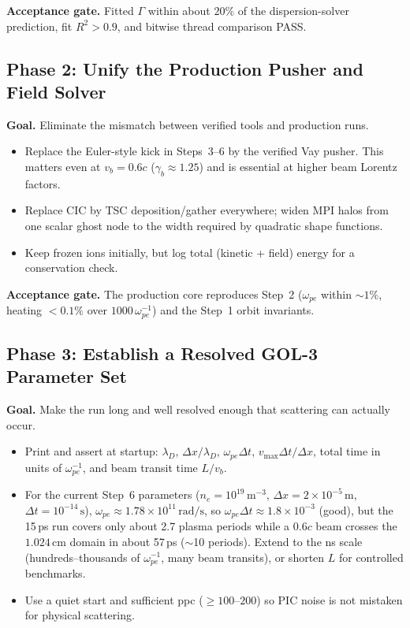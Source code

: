 \documentclass[11pt,a4paper]{article}
\begin{document}
\textbf{Acceptance gate.} Fitted $\Gamma$ within about $20\%$ of the dispersion-solver prediction,
fit $R^2>0.9$, and bitwise thread comparison PASS.

\subsection{Phase 2: Unify the Production Pusher and Field Solver}

\textbf{Goal.} Eliminate the mismatch between verified tools and production runs.

\begin{itemize}[leftmargin=*]
  \item Replace the Euler-style kick in Steps~3--6 by the verified Vay pusher. This matters even
        at $v_b=0.6c$ ($\gamma_b\approx1.25$) and is essential at higher beam Lorentz factors.
  \item Replace CIC by TSC deposition/gather everywhere; widen MPI halos from one scalar ghost
        node to the width required by quadratic shape functions.
  \item Keep frozen ions initially, but log total (kinetic + field) energy for a conservation check.
\end{itemize}

\textbf{Acceptance gate.} The production core reproduces Step~2 ($\omega_{pe}$ within $\sim1\%$,
heating $<0.1\%$ over $1000\,\omega_{pe}^{-1}$) and the Step~1 orbit invariants.

\subsection{Phase 3: Establish a Resolved GOL-3 Parameter Set}

\textbf{Goal.} Make the run long and well resolved enough that scattering can actually occur.

\begin{itemize}[leftmargin=*]
  \item Print and assert at startup: $\lambda_D$, $\Delta x/\lambda_D$, $\omega_{pe}\Delta t$,
        $v_{\max}\Delta t/\Delta x$, total time in units of $\omega_{pe}^{-1}$, and beam transit
        time $L/v_b$.
  \item For the current Step~6 parameters ($n_e=10^{19}\,\mathrm{m}^{-3}$,
        $\Delta x=2\times10^{-5}\,\mathrm{m}$, $\Delta t=10^{-14}\,\mathrm{s}$),
        $\omega_{pe}\approx1.78\times10^{11}\,\mathrm{rad/s}$, so $\omega_{pe}\Delta t\approx
        1.8\times10^{-3}$ (good), but the 15\,ps run covers only about 2.7 plasma periods while a
        $0.6c$ beam crosses the $1.024\,\mathrm{cm}$ domain in about 57\,ps ($\sim$10 periods).
        Extend to the ns scale (hundreds--thousands of $\omega_{pe}^{-1}$, many beam transits),
        or shorten $L$ for controlled benchmarks.
  \item Use a quiet start and sufficient ppc ($\ge 100$--$200$) so PIC noise is not mistaken for
        physical scattering.
\end{itemize}
\end{document}
